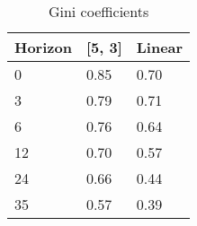 \begin{table}[]
    \centering
    \begin{tabular}{lll}
\hline
Horizon	&	[5, 3]	&	Linear	\\
\hline \hline
0	&	0.85	&	0.70	\\
3	&	0.79	&	0.71	\\
6	&	0.76	&	0.64	\\
12	&	0.70	&	0.57	\\
24	&	0.66	&	0.44	\\
35	&	0.57	&	0.39	\\
\hline
    \end{tabular}
    \caption{Gini coefficients}
    \label{tab:ginicoeff}
\end{table}

